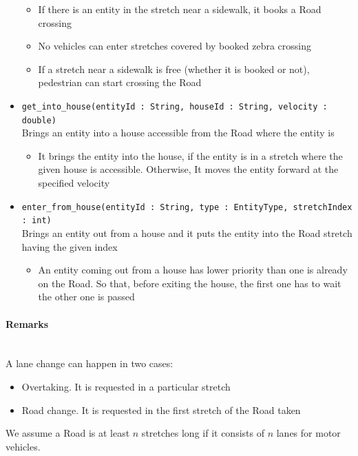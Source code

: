 \begin{itemize}
\begin{itemize}
		\item If there is an entity in the stretch near a sidewalk, it books a Road crossing
		\item No vehicles can enter stretches covered by booked zebra crossing
		\item If a stretch near a sidewalk is free (whether it is booked or not), pedestrian can start crossing the Road
	\end{itemize}
	\item \texttt{get\_into\_house(entityId : String, houseId : String, velocity : double)}
	\\Brings an entity into a house accessible from the Road where the entity is
	\begin{itemize}
		\item It brings the entity into the house, if the entity is in a stretch where the given house is accessible. Otherwise, It moves the entity forward at the specified velocity
	\end{itemize}
	\item \texttt{enter\_from\_house(entityId : String, type : EntityType, stretchIndex : int)}
	\\Brings an entity out from a house and it puts the entity into the Road stretch having the given index
	\begin{itemize}
		\item An entity coming out from a house has lower priority than one is already on the Road. So that, before exiting the house, the first one has to wait the other one is passed
	\end{itemize}
\end{itemize}
\paragraph{Remarks}
\ \\A lane change can happen in two cases:
\begin{itemize}
	\item Overtaking. It is requested in a particular stretch
	\item Road change. It is requested in the first stretch of the Road taken
\end{itemize}
We assume a Road is at least $n$ stretches long if it consists of $n$ lanes for motor vehicles.